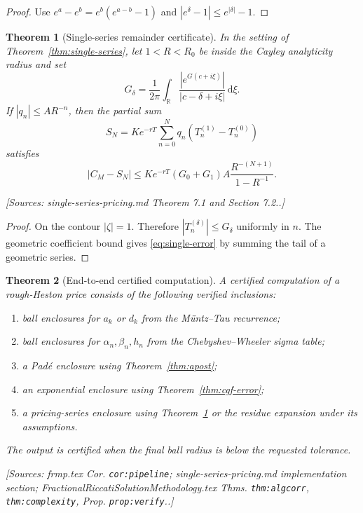 \documentclass[11pt]{article}
\newtheorem{theorem}{Theorem}[section]
\theoremstyle{definition}
\newcommand{\R}{\mathbb{R}}
\newcommand{\dd}{\,\mathrm{d}}
\newcommand{\Source}[1]{\par\smallskip\noindent\textup{[Sources: #1.]}}
\begin{document}
\begin{proof}
Use
$e^a-e^b=e^b(e^{a-b}-1)$
and
$|e^\delta-1|\le e^{|\delta|}-1$.
\end{proof}

\begin{theorem}[Single-series remainder certificate]\label{thm:single-error}
In the setting of Theorem~\ref{thm:single-series},
let $1<R<R_0$ be inside the Cayley analyticity radius and set
\begin{equation}\label{eq:GN}
        G_\delta=\frac1{2\pi}\int_{\R}\frac{|e^{G(c+i\xi)}|}{|c-\delta+i\xi|}\dd \xi.
\end{equation}
If $|q_n|\le A R^{-n}$,
then the partial sum
\begin{equation}\label{eq:SN}
        S_N=Ke^{-rT}\sum_{n=0}^{N}q_n(T_n^{(1)}-T_n^{(0)})
\end{equation}
satisfies
\begin{equation}\label{eq:single-error}
        |C_M-S_N|
        \le
        Ke^{-rT}(G_0+G_1)A\frac{R^{-(N+1)}}{1-R^{-1}}.
\end{equation}
\Source{single-series-pricing.md Theorem 7.1 and Section 7.2.}
\end{theorem}

\begin{proof}
On the contour $|\zeta|=1$.
Therefore $|T_n^{(\delta)}|\le G_\delta$ uniformly in $n$.
The geometric coefficient bound gives \eqref{eq:single-error} by summing the tail of a geometric series.
\end{proof}

\begin{theorem}[End-to-end certified computation]\label{thm:end-to-end}
A certified computation of a rough-Heston price consists of the following verified inclusions:
\begin{enumerate}[label=(\roman*)]
\item ball enclosures for $a_k$ or $d_k$ from the Müntz--Tau recurrence;
\item ball enclosures for $\alpha_n,\beta_n,h_n$ from the Chebyshev--Wheeler sigma table;
\item a Padé enclosure using Theorem~\ref{thm:apost};
\item an exponential enclosure using Theorem~\ref{thm:cgf-error};
\item a pricing-series enclosure using Theorem~\ref{thm:single-error} or the residue expansion under its assumptions.
\end{enumerate}
The output is certified when the final ball radius is below the requested tolerance.
\Source{frmp.tex Cor. \texttt{cor:pipeline}; single-series-pricing.md implementation section; FractionalRiccatiSolutionMethodology.tex Thms. \texttt{thm:algcorr}, \texttt{thm:complexity}, Prop. \texttt{prop:verify}.}
\end{theorem}
\end{document}
